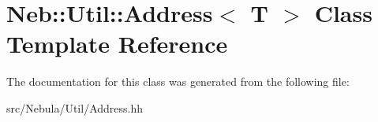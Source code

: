\hypertarget{classNeb_1_1Util_1_1Address}{\section{Neb\-:\-:Util\-:\-:Address$<$ T $>$ Class Template Reference}
\label{classNeb_1_1Util_1_1Address}
}


The documentation for this class was generated from the following file\-:\begin{DoxyCompactItemize}
\item 
src/\-Nebula/\-Util/Address.\-hh\end{DoxyCompactItemize}
